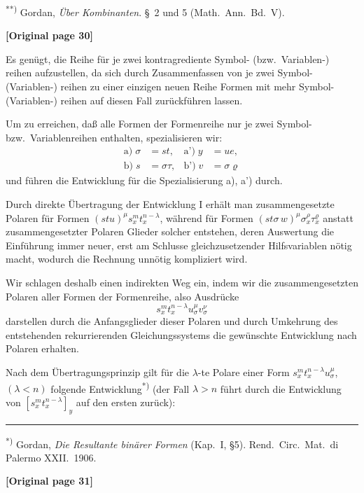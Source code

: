 \documentclass[12pt,a4paper]{article}
\begin{document}
\textsuperscript{**)} Gordan, \textit{Über Kombinanten}. §~2 und 5 (Math.\ Ann.\ Bd.\ V).
\normalsize
\medskip


\medskip
\noindent\textbf{[Original page 30]}

Es genügt, die Reihe für je zwei kontragrediente Symbol- (bzw.\ Variablen-) reihen aufzustellen, da sich durch Zusammenfassen von je zwei
Symbol- (Variablen-) reihen zu einer einzigen neuen Reihe Formen mit mehr
Symbol- (Variablen-) reihen auf diesen Fall zurückführen lassen.

Um zu erreichen, daß alle Formen der Formenreihe nur je zwei
Symbol- bzw.\ Variablenreihen enthalten, spezialisieren wir:
\begin{align*}
\text{a)} \; \sigma &= st, & \text{a')} \; y &= ue,\\
\text{b)} \; s &= \sigma\tau, & \text{b')} \; v &= \sigma\varrho
\end{align*}
und führen die Entwicklung für die Spezialisierung a), a') durch.

Durch direkte Übertragung der Entwicklung I erhält man
zusammengesetzte Polaren für Formen $(stu)^\mu s_x^m t_x^{n-\lambda}$,
während für Formen $(st\sigma\,w)^\mu \sigma_x^\rho \tau_x^\varrho$ anstatt zusammengesetzter Polaren Glieder solcher entstehen, deren Auswertung die Einführung immer neuer, erst am Schlusse gleichzusetzender Hilfsvariablen nötig macht, wodurch die Rechnung unnötig kompliziert wird.

Wir schlagen deshalb einen indirekten Weg ein, indem wir die zusammengesetzten Polaren aller Formen der Formenreihe, also Ausdrücke
\[s_x^m t_x^{n-\lambda} u_\sigma^\mu v_\sigma^\nu\]
darstellen durch die Anfangsglieder dieser Polaren und durch Umkehrung
des entstehenden rekurrierenden Gleichungssystems die gewünschte Entwicklung nach Polaren erhalten.

Nach dem Übertragungsprinzip gilt für die $\lambda$-te Polare einer Form
$s_x^m t_x^{n-\lambda} u_\sigma^\mu$, $(\lambda < n)$ folgende Entwicklung\textsuperscript{*)} (der Fall $\lambda > n$ führt durch die Entwicklung von $[s_x^m t_x^{n-\lambda}]_y$
auf den ersten zurück):

\smallskip
\noindent\rule{\textwidth}{0.4pt}
\small
\textsuperscript{*)} Gordan, \textit{Die Resultante binärer Formen} (Kap.\ I, \S5). Rend.\ Circ.\ Mat.\ di Palermo XXII.\ 1906.
\normalsize
\smallskip

\noindent\textbf{[Original page 31]}
\end{document}
